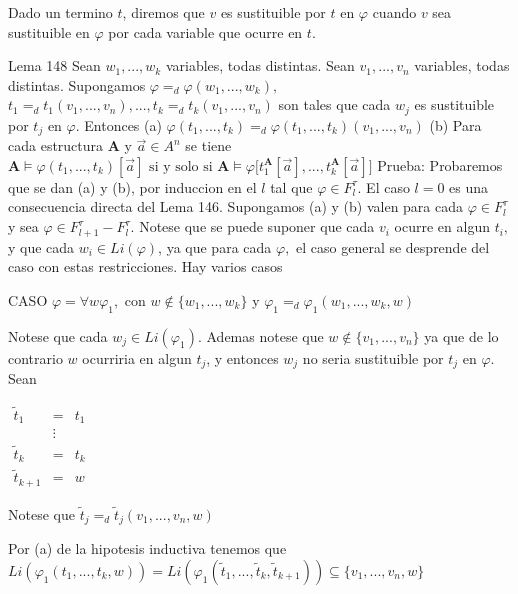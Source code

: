 Dado un termino \(t\), diremos que \(v\) es sustituible por \(t\) en \(\varphi \) cuando \(v\) sea sustituible en \(\varphi \) por cada variable que ocurre en \(t\).

Lema 148 Sean \(w_{1},...,w_{k}\) variables, todas distintas. Sean \( v_{1},...,v_{n}\) variables, todas distintas. Supongamos \(\varphi =_{d}\varphi (w_{1},...,w_{k}),\) \( t_{1}=_{d}t_{1}(v_{1},...,v_{n}),...,t_{k}=_{d}t_{k}(v_{1},...,v_{n})\) son tales que cada \(w_{j}\) es sustituible por \(t_{j}\) en \(\varphi .\) Entonces
(a) \(\varphi (t_{1},...,t_{k})=_{d}\varphi (t_{1},...,t_{k})(v_{1},...,v_{n})\)
(b) Para cada estructura \(\mathbf{A}\) y \(\vec{a}\in A^{n}\) se tiene
\(\displaystyle \mathbf{A}\models \varphi (t_{1},...,t_{k})[\vec{a}]\text{ si y solo si } \mathbf{A}\models \varphi \lbrack t_{1}^{\mathbf{A}}[\vec{a}],...,t_{k}^{ \mathbf{A}}[\vec{a}]] \)
Prueba: Probaremos que se dan (a) y (b), por induccion en el \(l\) tal que \(\varphi \in F_{l}^{\tau }.\) El caso \(l=0\) es una consecuencia directa del Lema 146. Supongamos (a) y (b) valen para cada \(\varphi \in F_{l}^{\tau } \) y sea \(\varphi \in F_{l+1}^{\tau }-F_{l}^{\tau }.\) Notese que se puede suponer que cada \(v_{i}\) ocurre en algun \(t_{i},\) y que cada \(w_{i}\in Li(\varphi )\), ya que para cada \(\varphi ,\) el caso general se desprende del caso con estas restricciones. Hay varios casos

CASO \(\varphi =\forall w\varphi _{1},\) con \(w\not\in \{w_{1},...,w_{k}\}\) y \( \varphi _{1}=_{d}\varphi _{1}(w_{1},...,w_{k},w)\)

Notese que cada \(w_{j}\in Li(\varphi _{1})\). Ademas notese que \( w\not\in \{v_{1},...,v_{n}\}\) ya que de lo contrario \(w\) ocurriria en algun \( t_{j}\), y entonces \(w_{j}\) no seria sustituible por \(t_{j}\) en \(\varphi \). Sean

\(\displaystyle \begin{array}{ccc} \tilde{t}_{1} & = & t_{1} \\ & \vdots & \\ \tilde{t}_{k} & = & t_{k} \\ \tilde{t}_{k+1} & = & w \end{array} \)

Notese que
\(\displaystyle \tilde{t}_{j}=_{d}\tilde{t}_{j}(v_{1},...,v_{n},w) \)

Por (a) de la hipotesis inductiva tenemos que
\(\displaystyle Li(\varphi _{1}(t_{1},...,t_{k},w))=Li(\varphi _{1}(\tilde{t}_{1},...,\tilde{ t}_{k},\tilde{t}_{k+1}))\subseteq \{v_{1},...,v_{n},w\} \)

